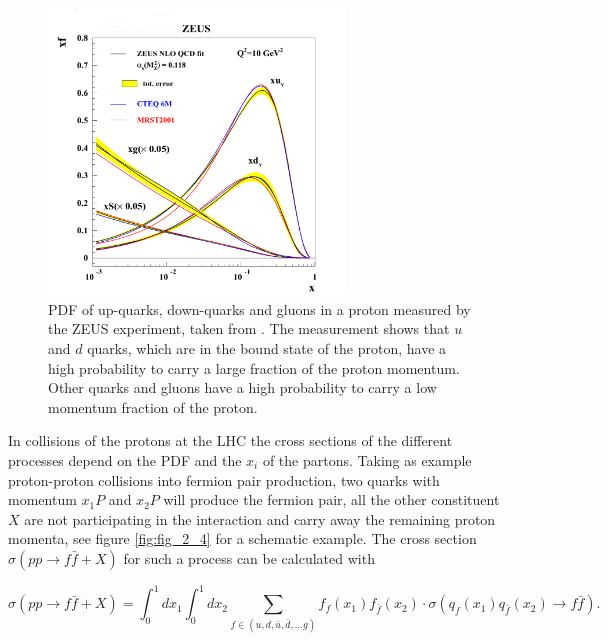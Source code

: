 \begin{figure}[ht]
	\centering
	\includegraphics[width=0.7\textwidth]{pictures/ZEUS_PDF.pdf}

	\caption[Proton \gls{PDF} from ZEUS]{\gls{PDF} of up-quarks, down-quarks and gluons in a proton measured by the ZEUS experiment, taken from \cite{PDFMEAS}. The measurement shows that $u$ and $d$ quarks, which are in the bound state of the proton, have a high probability to carry a large fraction of the proton momentum. Other quarks and gluons have a high probability to carry a low momentum fraction of the proton.}
	\label{fig:fig_2_3}
\end{figure}

In collisions of the protons at the \gls{LHC} the cross sections of the different processes depend on the \gls{PDF} and the $x_{i}$ of the partons. Taking as example proton-proton collisions into fermion pair production, two quarks with momentum $x_{1}P$ and $x_{2}P$ will produce the fermion pair, all the other constituent $X$ are not participating in the interaction and carry away the remaining proton momenta, see figure \ref{fig:fig_2_4} for a schematic example. The cross section $\sigma(pp\to f\bar{f} + X)$ \cite{Peskin} for such a process can be calculated with 

\begin{equation}
	\label{eq:eq_2_3}
	\sigma(pp\to f\bar{f} + X) = \int_{0}^{1}dx_{1}\int_{0}^{1}dx_{2}\sum_{f \in (u, d, \bar{u}, \bar{d}, ... g)} f_{f}(x_{1})f_{\bar{f}}(x_{2}) \cdot \sigma(q_{f}(x_{1})q_{\bar{f}}(x_{2}) \to f\bar{f}). 
\end{equation}


